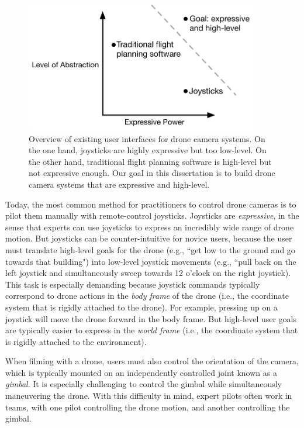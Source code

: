 \begin{figure}[th!]
\centering
\includegraphics[width=4.0in]{images/2018_introduction/intro.pdf}
\caption{
Overview of existing user interfaces for drone camera systems.
On the one hand, joysticks are highly expressive but too low-level.
On the other hand, traditional flight planning software is high-level but not expressive enough.
Our goal in this dissertation is to build drone camera systems that are expressive and high-level.
}
\label{fig:ch1:intro}
\end{figure}

Today, the most common method for practitioners to control drone cameras is to pilot them manually with remote-control joysticks.
Joysticks are \emph{expressive}, in the sense that experts can use joysticks to express an incredibly wide range of drone motion.
But joysticks can be counter-intuitive for novice users, because the user must translate high-level goals for the drone (e.g., ``get low to the ground and go towards that building") into low-level joystick movements (e.g., ``pull back on the left joystick and simultaneously sweep towards 12 o'clock on the right joystick).
This task is especially demanding because joystick commands typically correspond to drone actions in the \emph{body frame} of the drone (i.e., the coordinate system that is rigidly attached to the drone). 
For example, pressing up on a joystick will move the drone forward in the body frame.
But high-level user goals are typically easier to express in the \emph{world frame} (i.e., the coordinate system that is rigidly attached to the environment).

When filming with a drone, users must also control the orientation of the camera, which is typically mounted on an independently controlled joint known as a \emph{gimbal}.
It is especially challenging to control the gimbal while simultaneously maneuvering the drone.
With this difficulty in mind, expert pilots often work in teams, with one pilot controlling the drone motion, and another controlling the gimbal.

